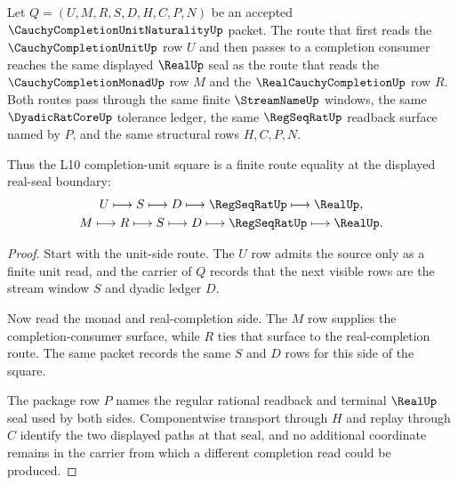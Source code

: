 \begin{theorem}
\label{thm:cauchy-completion-unit-naturality-square}
Let $Q=(U,M,R,S,D,H,C,P,N)$ be an accepted $\CauchyCompletionUnitNaturalityUp$ packet. The route that first reads the $\CauchyCompletionUnitUp$ row $U$ and then passes to a completion consumer reaches the same displayed $\RealUp$ seal as the route that reads the $\CauchyCompletionMonadUp$ row $M$ and the $\RealCauchyCompletionUp$ row $R$. Both routes pass through the same finite $\StreamNameUp$ windows, the same $\DyadicRatCoreUp$ tolerance ledger, the same $\RegSeqRatUp$ readback surface named by $P$, and the same structural rows $H,C,P,N$.

Thus the L10 completion-unit square is a finite route equality at the displayed real-seal boundary:
$$
\begin{gathered}
U \longmapsto S \longmapsto D \longmapsto \RegSeqRatUp \longmapsto \RealUp,\\
M \longmapsto R \longmapsto S \longmapsto D \longmapsto \RegSeqRatUp \longmapsto \RealUp .
\end{gathered}
$$
\end{theorem}
\begin{proof}
Start with the unit-side route. The $U$ row admits the source only as a finite unit read, and the carrier of $Q$ records that the next visible rows are the stream window $S$ and dyadic ledger $D$.

Now read the monad and real-completion side. The $M$ row supplies the completion-consumer surface, while $R$ ties that surface to the real-completion route. The same packet records the same $S$ and $D$ rows for this side of the square.

The package row $P$ names the regular rational readback and terminal $\RealUp$ seal used by both sides. Componentwise transport through $H$ and replay through $C$ identify the two displayed paths at that seal, and no additional coordinate remains in the carrier from which a different completion read could be produced.
\end{proof}

